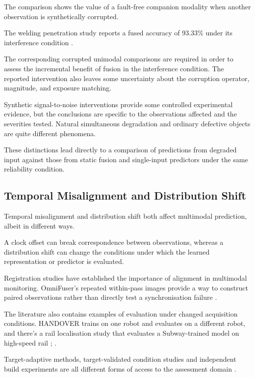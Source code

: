 The comparison shows the value of a fault-free companion modality when another observation is
synthetically corrupted.

The welding penetration study reports a fused accuracy of 93.33\% under its interference condition
\parencite[Table~3]{Hua2026Weld}.

The corresponding corrupted unimodal comparisons are required in order to assess the incremental
benefit of fusion in the interference condition. The reported intervention also leaves some
uncertainty about the corruption operator, magnitude, and exposure matching.

Synthetic signal-to-noise interventions provide some controlled experimental evidence, but the
conclusions are specific to the observations affected and the severities tested. Natural
simultaneous degradation and ordinary defective objects are quite different phenomena.

These distinctions lead directly to a comparison of predictions from degraded input against those
from static fusion and single-input predictors under the same reliability condition.

\subsection{Temporal Misalignment and Distribution Shift}

Temporal misalignment and distribution shift both affect multimodal prediction, albeit in different
ways.

A clock offset can break correspondence between observations, whereas a distribution shift can
change the conditions under which the learned representation or predictor is evaluated.

Registration studies have established the importance of alignment in multimodal monitoring.
OmniFuser's repeated within-pass images provide a way to construct paired observations rather than
directly test a synchronisation failure \parencite{Petrich2021Multimodal,Chen2023Multisensor,P021}.

The literature also contains examples of evaluation under changed acquisition conditions. HANDOVER
trains on one robot and evaluates on a different robot, and there's a rail localisation study that
evaluates a Subway-trained model on high-speed rail \parencite[PDF p.~7, Table~V]{Thoduka2024Handover};
\parencite[PDF p.~10, Table~III]{P031}.

Target-adaptive methods, target-validated condition studies and independent build experiments are
all different forms of access to the assessment domain
\parencite{Wang2025A,Chu2024A,Huang2026Rolling,Bevans2023Heterogeneous}.

